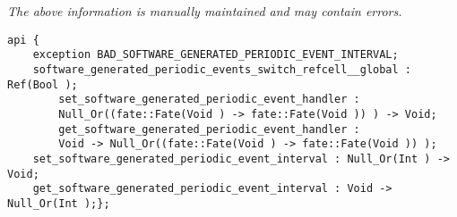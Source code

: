 \label{api:Software\_Generated\_Periodic\_Events}

{\tiny \it The above information is manually maintained and may contain errors.}
\begin{verbatim}
api {
    exception BAD_SOFTWARE_GENERATED_PERIODIC_EVENT_INTERVAL;
    software_generated_periodic_events_switch_refcell__global : Ref(Bool );
        set_software_generated_periodic_event_handler :
        Null_Or((fate::Fate(Void ) -> fate::Fate(Void )) ) -> Void;
        get_software_generated_periodic_event_handler :
        Void -> Null_Or((fate::Fate(Void ) -> fate::Fate(Void )) );
    set_software_generated_periodic_event_interval : Null_Or(Int ) -> Void;
    get_software_generated_periodic_event_interval : Void -> Null_Or(Int );};
\end{verbatim}
